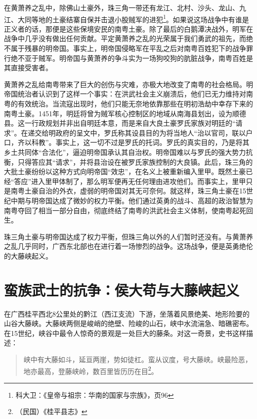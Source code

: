 在黄萧养之乱中，除佛山土豪外，珠三角一带还有龙江、北村、沙头、龙山、九江、大同等地的土豪结寨自保并击退小股贼军的进犯\footnote{科大卫：《皇帝与祖宗：华南的国家与宗族》，页96}。如果说这场战争中有谁是正义者的话，那便是这些保境安民的南粤土豪。除了最后的白鹅潭决战外，明军在战争中几乎没有做出任何贡献。平定黄萧养之乱的光荣属于我们勇武的祖先，而绝不属于残暴的明帝国。事实上，明帝国侵略军在平乱之后对南粤百姓犯下的战争罪行绝不亚于贼军。明帝国与黄萧养的争斗实为一场狗咬狗的肮脏战争，南粤百姓是其直接受害者。

黄萧养之乱给南粤带来了巨大的创伤与灾难，亦极大地改变了南粤的社会格局。明帝国统治者认识到了这样一个事实：在洪武社会主义崩溃后，他们已无力维持对南粤的有效统治。当流寇出现时，他们只能无奈地依靠那些在明初浩劫中幸存下来的南粤土豪。1451年，明廷将曾为贼军核心控制区的地域从南海县划出，设为顺德县。这一行政规划并非出自明廷本意，而是来自大良土豪罗氏家族对明廷的“请求”。在递交给明政府的呈文中，罗氏称其设县目的为将当地人“治以官司，联以户口，齐以科教”。事实上，这一切不过是罗氏的托词。罗氏的真实目的，乃是将其乡土共同体“合法化”，逼迫明帝国承认其自治权。明帝国难以与罗氏的强大势力抗衡，只得答应其“请求”，并将县治设在被罗氏家族控制的大良镇。此后，珠三角的大批土豪纷纷以这种方式向明帝国“效忠”，在名义上被重新编入里甲。既然土豪已经“答应”进入里甲体制了，那么明军便再无任何理由进攻他们。而事实上，里甲只是南粤土豪自治的外衣，虚弱的明帝国对其无可奈何。就这样，珠三角土豪在15世纪中期与明帝国达成了微妙的权力平衡。他们通过英勇的战斗、高超的政治智慧为南粤夺回了相当一部分自由，彻底终结了南粤的洪武社会主义体制，使南粤起死回生。

珠三角土豪与明帝国达成了权力平衡，但珠三角以外的人们暂时还没有。与黄萧养之乱几乎同时，广西东北部也在进行着一场惨烈的战争。这场战争，便是英勇绝伦的大藤峡起义。

\section{蛮族武士的抗争：侯大苟与大藤峡起义}

在广西桂平西北8公里处的黔江（西江支流）下游，坐落着风景绝美、地形险要的山谷大藤峡。大藤峡两侧是峻峭的绝壁、险峻的山石，峡中水流湍急、暗礁密布。在15世纪，峡谷中最令人惊奇的景观是一处巨大的藤条。对这一奇景，史书这样描述：

\begin{quote}
	
峡中有大藤如斗，延亘两崖，势如徒杠。蛮从议度，号大藤峡。峡最险恶，地亦最高，登藤峡岭，数百里皆历历在目\footnote{（民国）《桂平县志》}。
\end{quote}

